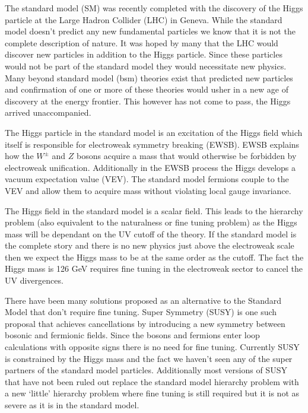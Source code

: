 
The standard model (SM) was recently completed with the discovery of the Higgs particle at the Large Hadron Collider (LHC) in Geneva.
While the standard model doesn't predict any new fundamental particles we know that it is not the complete description of nature.
It was hoped by many that the LHC would discover new particles in addition to the Higgs particle.
Since these particles would not be part of the standard model they would necessitate new physics.
Many beyond standard model (bsm) theories exist that predicted new particles and confirmation of one or more of these theories would usher in a new age of discovery at the energy frontier. 
This however has not come to pass, the Higgs arrived unaccompanied.

The Higgs particle in the standard model is an excitation of the Higgs field which itself is responsible for electroweak symmetry breaking (EWSB).
EWSB explains how the $W^{\pm}$ and $Z$ bosons acquire a mass that would otherwise be forbidden by electroweak unification.
Additionally in the EWSB process the Higgs develops a vacuum expectation value (VEV).
The standard model fermions couple to the VEV and allow them to acquire mass without violating local gauge invariance.

The Higgs field in the standard model is a scalar field.
This leads to the hierarchy problem (also equivalent to the naturalness or fine tuning problem) as the Higgs mass will be dependant on the UV cutoff of the theory.
If the standard model is the complete story and there is no new physics just above the electroweak scale then we expect the Higgs mass to be at the same order as the cutoff.
The fact the Higgs mass is 126 GeV requires fine tuning in the electroweak sector to cancel the UV divergences.

There have been many solutions proposed as an alternative to the Standard Model that don't require fine tuning.
Super Symmetry (SUSY) is one such proposal that achieves cancellations by introducing a new symmetry between bosonic and fermionic fields.
Since the bosons and fermions enter loop calculations with opposite signs there is no need for fine tuning.
Currently SUSY is constrained by the Higgs mass and the fact we haven't seen any of the super partners of the standard model particles.
Additionally most versions of SUSY that have not been ruled out replace the standard model hierarchy problem with a new  `little' hierarchy problem where fine tuning is still required but it is not as severe as it is in the standard model.

